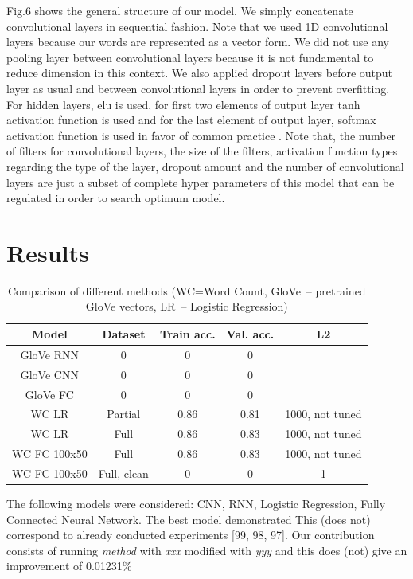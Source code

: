 \documentclass[10pt,conference,compsocconf]{IEEEtran}
\begin{document}
Fig.6 shows the general structure of our model. We simply concatenate convolutional layers in sequential fashion. Note that we used 1D convolutional layers because our words are represented as a vector form. We did not use any pooling layer between convolutional layers because it is not fundamental to reduce dimension in this context. We also applied dropout layers before output layer as usual and between convolutional layers \cite{cnn5}in order to prevent overfitting. For hidden layers, elu is used, for first two elements of output layer tanh activation function is used and for the last element of output layer, softmax activation function is used in favor of common practice \cite{cnn6}.
Note that, the number of filters for convolutional layers, the size of the filters, activation function types regarding the type of the layer, dropout amount and the number of convolutional layers are just a subset of complete hyper parameters of this model that can be regulated in order to search optimum model.

\section{Results}
\begin{table}[ht]
	\centering
	\tiny
	\begin{tabular}{|c | c |  c | c | c |} 
		\hline
		Model & Dataset & Train acc. & Val. acc. & L2 \\
		\hline
		GloVe RNN & 0 & 0 & 0 &   \\ 
		\hline
		GloVe CNN & 0 & 0 & 0 &  \\
		\hline
		GloVe FC & 0 & 0 & 0 & \\
		\hline
		WC LR & Partial & 0.86 & 0.81 & 1000, not tuned\\
		\hline
		WC LR & Full & 0.86 & 0.83 & 1000, not tuned\\
		\hline
		WC FC 100x50 & Full & 0.86 & 0.83 & 1000, not tuned\\
		\hline
		WC FC 100x50 & Full, clean & 0 & 0 & 1\\ [1ex] 
		\hline
	\end{tabular}
	\caption{Comparison of different methods (WC=Word Count, GloVe~-- pretrained GloVe vectors, LR~-- Logistic Regression)}
	\label{tab:results}
\end{table}

The following models were considered: CNN, RNN, Logistic Regression, Fully Connected Neural Network. The best model demonstrated This (does not) correspond to already conducted experiments [99, 98, 97]. Our contribution consists of running {\em method} with {\em xxx} modified with {\em yyy} and this does (not) give an improvement of 0.01231\%
\end{document}
